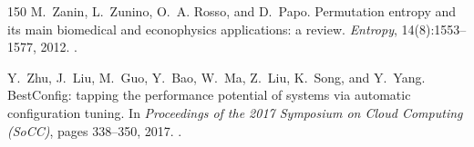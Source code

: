 \begin{thebibliography}{150}
M.~Zanin, L.~Zunino, O.~A. Rosso, and D.~Papo. Permutation entropy and its main biomedical and econophysics applications: a review. \emph{Entropy}, 14(8):1553--1577, 2012. .

Y.~Zhu, J.~Liu, M.~Guo, Y.~Bao, W.~Ma, Z.~Liu, K.~Song, and Y.~Yang. BestConfig: tapping the performance potential of systems via automatic configuration tuning. In \emph{Proceedings of the 2017 Symposium on Cloud Computing (SoCC)}, pages 338--350, 2017. .

\end{thebibliography}
